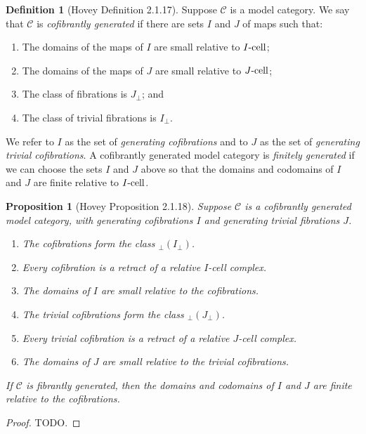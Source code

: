 \documentclass{amsart}
\theoremstyle{plain}
\newtheorem{proposition}[theorem]{Proposition}
\theoremstyle{definition}
\newtheorem{definition}[theorem]{Definition}
\newcommand{\0}{\mathbf{0}}
\newcommand{\cC}{\mathcal C}
\newcommand{\p}{{_\perp}}
\renewcommand{\(}{\left(}
\renewcommand{\)}{\right)}
\newcommand{\cell}{\text-\mathrm{cell}}
\begin{document}
\begin{definition}[Hovey Definition 2.1.17]\label{2.1.17}
  Suppose $\cC$ is a model category. We say that $\cC$ is \textit{cofibrantly generated} if there are sets $I$ and $J$ of maps such that:\begin{enumerate}[label=\arabic*.,noitemsep,topsep=0pt]
    \item The domains of the maps of $I$ are small relative to $I\cell$;
    \item The domains of the maps of $J$ are small relative to $J\cell$;
    \item The class of fibrations is $J\p$; and
    \item The class of trivial fibrations is $I\p$.
  \end{enumerate}
  We refer to $I$ as the set of \textit{generating cofibrations} and to $J$ as the set of \textit{generating trivial cofibrations}. A cofibrantly generated model category is \textit{finitely generated} if we can choose the sets $I$ and $J$ above so that the domains and codomains of $I$ and $J$ are finite relative to $I\cell$.
\end{definition}

\begin{proposition}[Hovey Proposition 2.1.18]\label{2.1.18}
  Suppose $\cC$ is a cofibrantly generated model category, with generating cofibrations $I$ and generating trivial fibrations $J$.\begin{enumerate}[label=(\alph*),noitemsep,topsep=0pt]
    \item The cofibrations form the class ${\p(I\p)}$.
    \item Every cofibration is a retract of a relative $I$-cell complex.
    \item The domains of $I$ are small relative to the cofibrations.
    \item The trivial cofibrations form the class ${\p(J\p)}$.
    \item Every trivial cofibration is a retract of a relative $J$-cell complex.
    \item The domains of $J$ are small relative to the trivial cofibrations.
  \end{enumerate}
  If $\cC$ is fibrantly generated, then the domains and codomains of $I$ and $J$ are finite relative to the cofibrations.
\end{proposition}
\begin{proof}
  \color{red}TODO.
\end{proof}
\end{document}
